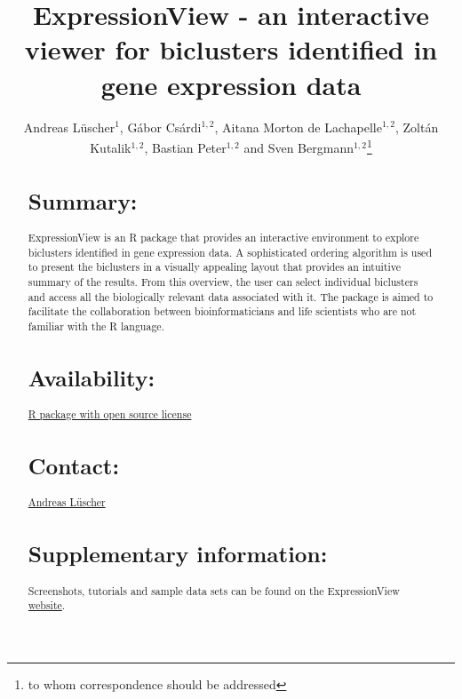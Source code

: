 \documentclass[round]{bioinfo}
\begin{document}
\application{}
\title[ExpressionView]{ExpressionView - an interactive viewer for biclusters identified in gene expression data}
\author[Andreas L\"uscher, G\'abor Cs\'ardi, Aitana Morton de Lachapelle, Zolt\'an Kutalik, and Sven Bergmann]{Andreas L\"uscher$^1$, G\'abor Cs\'ardi$^{1,2}$, Aitana Morton de Lachapelle$^{1,2}$, Zolt\'an Kutalik$^{1,2}$, Bastian Peter$^{1,2}$ and Sven Bergmann$^{1,2}$\footnote{to whom correspondence should be addressed}}
\address{
	$^{1}$Swiss Institute of Bioinformatics, Lausanne, Switzerland\\
	$^{2}$Department of Medical Genetics, University of Lausanne, Lausanne, Switzerland
}



\maketitle

\begin{abstract}

\section{Summary:}
ExpressionView is an R package that provides an interactive environment to explore biclusters identified in gene expression data. A sophisticated ordering algorithm is used to present the biclusters in a visually appealing layout that provides an intuitive summary of the results. From this overview, the user can select individual biclusters and access all the biologically relevant data associated with it. The package is aimed to facilitate the collaboration between bioinformaticians and life scientists who are not familiar with the R language.

\section{Availability:} 
\href{http://www2.unil.ch/cbg/index.php?title=ExpressionView}{R package with open source license}

\section{Contact:} 
\href{andreas.luescher@a3.epfl.ch}{Andreas L\"uscher}

\section{Supplementary information:}
Screenshots, tutorials and sample data sets can be found on the ExpressionView \href{http://www2.unil.ch/cbg/index.php?title=ExpressionView}{website}.

\end{abstract}
\end{document}
